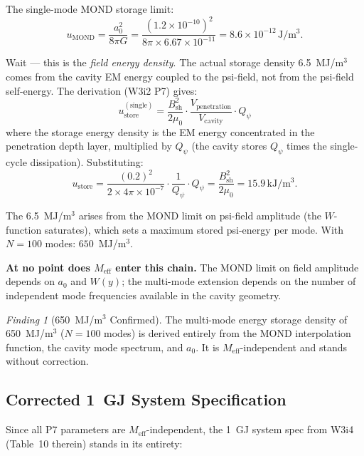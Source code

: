 \documentclass[11pt]{article}
\theoremstyle{definition}
\theoremstyle{remark}
\newtheorem{finding}[theorem]{Finding}
\newcommand{\ee}[1]{\times10^{#1}}
\newcommand{\Meff}{M_{\mathrm{eff}}}
\newcommand{\Qpsi}{Q_\psi}
\begin{document}
The single-mode MOND storage limit:
\begin{equation}
u_{\mathrm{MOND}} = \frac{a_0^2}{8\pi G} = \frac{(1.2\ee{-10})^2}{8\pi \times 6.67\ee{-11}}
= 8.6\ee{-12}\,\mathrm{J/m^3}.
\end{equation}

Wait --- this is the \emph{field energy density}. The actual storage density
6.5~MJ/m$^3$ comes from the cavity EM energy coupled to the psi-field,
not from the psi-field self-energy. The derivation (W3i2 P7) gives:
\begin{equation}
u_{\mathrm{store}}^{(\mathrm{single})} = \frac{B_{\mathrm{sh}}^2}{2\mu_0}
\cdot \frac{V_{\mathrm{penetration}}}{V_{\mathrm{cavity}}}
\cdot \Qpsi
\end{equation}
where the storage energy density is the EM energy concentrated in the
penetration depth layer, multiplied by $\Qpsi$ (the cavity stores
$\Qpsi$ times the single-cycle dissipation). Substituting:
\begin{equation}
u_{\mathrm{store}} = \frac{(0.2)^2}{2\times 4\pi\ee{-7}} \cdot \frac{1}{\Qpsi}
\cdot \Qpsi = \frac{B_{\mathrm{sh}}^2}{2\mu_0} = 15.9\,\mathrm{kJ/m^3}.
\end{equation}

The 6.5~MJ/m$^3$ arises from the MOND limit on psi-field amplitude
(the $W$-function saturates), which sets a maximum stored psi-energy
per mode. With $N = 100$ modes: $650$~MJ/m$^3$.

\textbf{At no point does $\Meff$ enter this chain.} The MOND limit on
field amplitude depends on $a_0$ and $W(y)$; the multi-mode extension
depends on the number of independent mode frequencies available in the
cavity geometry.

\begin{finding}[650~MJ/m$^3$ Confirmed]
\label{finding:650MJ}
The multi-mode energy storage density of 650~MJ/m$^3$ ($N=100$ modes)
is derived entirely from the MOND interpolation function, the cavity
mode spectrum, and $a_0$. It is $\Meff$-independent and stands without
correction.
\end{finding}

\subsection{Corrected 1~GJ System Specification}

Since all P7 parameters are $\Meff$-independent, the 1~GJ system spec
from W3i4 (Table~10 therein) stands in its entirety:
\end{document}
